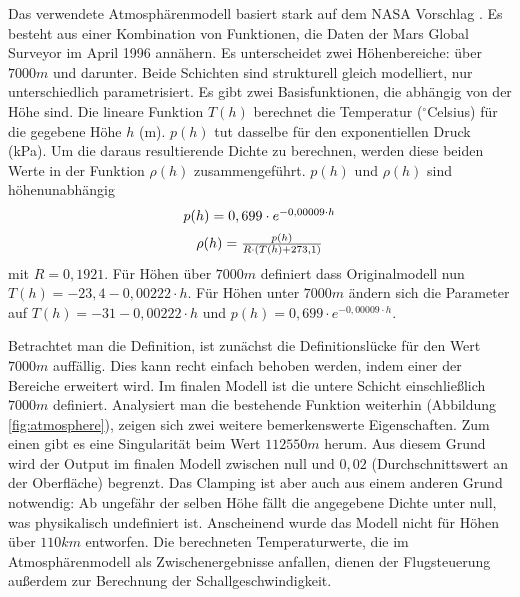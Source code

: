 Das verwendete Atmosphärenmodell basiert stark auf dem NASA Vorschlag \cite{Hall2015}. Es besteht aus einer Kombination von Funktionen, die Daten der Mars Global Surveyor im April 1996 annähern. Es unterscheidet zwei Höhenbereiche: über $7000m$ und darunter. Beide Schichten sind strukturell gleich modelliert, nur unterschiedlich parametrisiert. Es gibt zwei Basisfunktionen, die abhängig von der Höhe sind. Die lineare Funktion $T(h)$ berechnet die Temperatur ($^{\circ}$Celsius) für die gegebene Höhe $h$ (m). $p(h)$ tut dasselbe für den exponentiellen Druck (kPa). Um die daraus resultierende Dichte zu berechnen, werden diese beiden Werte in der Funktion $\rho(h)$ zusammengeführt. $p(h)$ und $\rho(h)$ sind höhenunabhängig
\begin{equation}
	$$ p(h) = 0,699 \cdot e^{-0,00009 \cdot h}$$
\end{equation}
\begin{equation}
	$$ \rho(h) =  \frac{p(h)}{R \cdot (T(h) + 273,1)} $$
\end{equation}
mit $ R = 0,1921 $. Für Höhen über $7000m$ definiert dass Originalmodell nun $ T(h) = -23,4 - 0,00222 \cdot h $. Für Höhen unter $7000m$ ändern sich die Parameter auf $ T(h) = -31 - 0,00222 \cdot h $ und $ p(h) = 0,699 \cdot e^{-0,00009 \cdot h}$.

Betrachtet man die Definition, ist zunächst die Definitionslücke für den Wert $7000m$ auffällig. Dies kann recht einfach behoben werden, indem einer der Bereiche erweitert wird. Im finalen Modell ist die untere Schicht einschließlich $7000m$ definiert. Analysiert man die bestehende Funktion weiterhin (Abbildung \ref{fig:atmosphere}), zeigen sich zwei weitere bemerkenswerte Eigenschaften.
Zum einen gibt es eine Singularität beim Wert $112550m$ herum. Aus diesem Grund wird der Output im finalen Modell zwischen null und $0,02$ (Durchschnittswert an der Oberfläche)\cite{NASA2016} begrenzt. Das Clamping ist aber auch aus einem anderen Grund notwendig: Ab ungefähr der selben Höhe fällt die angegebene Dichte unter null, was physikalisch undefiniert ist. Anscheinend wurde das Modell nicht für Höhen über $110 km$ entworfen. Die berechneten Temperaturwerte, die im Atmosphärenmodell als Zwischenergebnisse anfallen, dienen der Flugsteuerung außerdem zur Berechnung der Schallgeschwindigkeit.